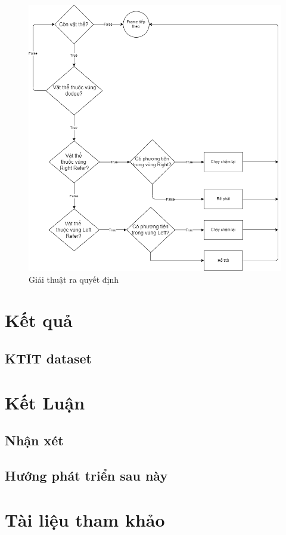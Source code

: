 \documentclass[a4paper,10pt]{article}
\begin{document}
		\begin{figure}[h]
 		\label{fig:flowchart}
		\begin{center}
		\includegraphics[width=.8\textwidth]{image/algo-flowchart.png} %
		\caption{Giải thuật ra quyết định}
		\end{center}
		\end{figure}	



\section{Kết quả}
    \subsection{KTIT dataset}
\section{Kết Luận}
    \subsection{Nhận xét}
    \subsection{Hướng phát triển sau này}
\section{Tài liệu tham khảo}
\end{document}
